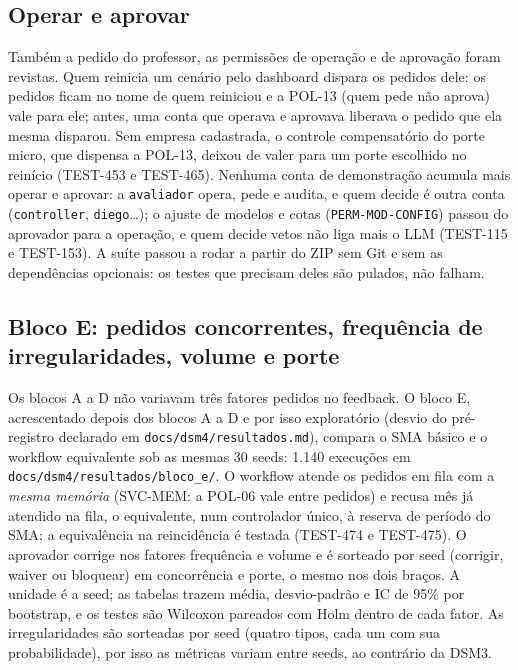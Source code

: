\documentclass[10pt,a4paper]{article}
\newcommand{\code}[1]{\texttt{#1}}
\begin{document}
\subsection{Operar e aprovar}
Também a pedido do professor, as permissões de operação e de aprovação foram revistas. Quem reinicia um cenário pelo
dashboard dispara os pedidos dele: os pedidos ficam no nome de quem reiniciou e a POL-13 (quem pede não aprova) vale
para ele; antes, uma conta que operava e aprovava liberava o pedido que ela mesma disparou. Sem empresa cadastrada, o
controle compensatório do porte micro, que dispensa a POL-13, deixou de valer para um porte escolhido no reinício
(TEST-453 e TEST-465). Nenhuma conta de demonstração acumula mais operar e aprovar: a \code{avaliador} opera, pede e
audita, e quem decide é outra conta (\code{controller}, \code{diego}\ldots); o ajuste de modelos e cotas
(\code{PERM-MOD-CONFIG}) passou do aprovador para a operação, e quem decide vetos não liga mais o LLM (TEST-115 e
TEST-153). A suíte passou a rodar a partir do ZIP sem Git e sem as dependências opcionais: os testes que
precisam deles são pulados, não falham.

\subsection{Bloco E: pedidos concorrentes, frequência de irregularidades, volume e porte}
Os blocos A a D não variavam três fatores pedidos no feedback. O bloco E, acrescentado depois dos blocos A a D e por
isso exploratório (desvio do pré-registro declarado em \code{docs/dsm4/resultados.md}), compara o SMA básico e o
workflow equivalente sob as mesmas 30 seeds: 1.140 execuções em \code{docs/dsm4/resultados/bloco\_e/}. O workflow atende
os pedidos em fila com a \emph{mesma memória} (SVC-MEM: a POL-06 vale entre pedidos) e recusa mês já atendido na fila,
o equivalente, num controlador único, à reserva de período do SMA; a equivalência na reincidência é testada
(TEST-474 e TEST-475). O aprovador corrige nos fatores frequência e volume e é sorteado por seed (corrigir, waiver ou
bloquear) em concorrência e porte, o mesmo nos dois braços. A unidade é a seed; as tabelas trazem média, desvio-padrão e IC de 95\% por
bootstrap, e os testes são Wilcoxon pareados com Holm dentro de cada fator. As irregularidades são sorteadas por seed
(quatro tipos, cada um com sua probabilidade), por isso as métricas variam entre seeds, ao contrário da DSM3.
\end{document}
